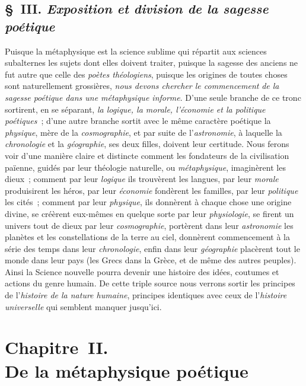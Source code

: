 \documentclass[french,twoside]{book} %
\newcommand\chapteropen{} %
\newcommand\chapterclose{} %
\begin{document}
\section[{§ III. Exposition et division de la sagesse poétique}]{§ III. {\itshape Exposition et division de la sagesse poétique}}
\noindent Puisque la métaphysique est la science sublime qui répartit aux sciences subalternes les sujets dont elles doivent traiter, puisque la sagesse des anciens ne fut autre que celle des {\itshape poètes théologiens}, puisque les origines de toutes choses sont naturellement grossières, {\itshape nous devons chercher le commencement}  {\itshape de la sagesse poétique dans une métaphysique informe}. D’une seule branche de ce tronc sortirent, en se séparant, {\itshape la logique, la morale, l’économie et la politique poétiques} ; d’une autre branche sortit avec le même caractère poétique la {\itshape physique}, mère de la {\itshape cosmographie}, et par suite de l’{\itshape astronomie}, à laquelle la {\itshape chronologie} et la {\itshape géographie}, ses deux filles, doivent leur certitude. Nous ferons voir d’une manière claire et distincte comment les fondateurs de la civilisation païenne, guidés par leur théologie naturelle, ou {\itshape métaphysique}, imaginèrent les dieux ; comment par leur {\itshape logique} ils trouvèrent les langues, par leur {\itshape morale} produisirent les héros, par leur {\itshape économie} fondèrent les familles, par leur {\itshape politique} les cités ; comment par leur {\itshape physique}, ils donnèrent à chaque chose une origine divine, se créèrent eux-mêmes en quelque sorte par leur {\itshape physiologie}, se firent un univers tout de dieux par leur {\itshape cosmographie}, portèrent dans leur {\itshape astronomie} les planètes et les constellations de la terre au ciel, donnèrent commencement à la série des temps dans leur {\itshape chronologie}, enfin dans leur {\itshape géographie} placèrent tout le monde dans leur pays (les Grecs dans la Grèce, et de même des autres peuples). Ainsi la Science nouvelle pourra devenir une histoire des idées, coutumes et actions du genre humain. De cette triple source nous verrons sortir les principes de l’{\itshape histoire de la nature humaine}, principes identiques avec ceux de l’{\itshape histoire universelle} qui semblent manquer jusqu’ici.
\chapterclose


\chapteropen
\chapter[{Chapitre II. De la métaphysique poétique}]{Chapitre II. \\
De la métaphysique poétique}
\end{document}
